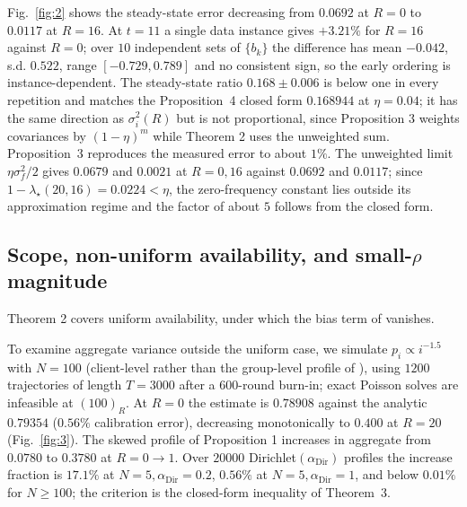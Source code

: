 \documentclass[twoside,11pt]{article}
\begin{document}
Fig.~\ref{fig:2} shows the steady-state error decreasing from
$0.0692$ at $R=0$ to $0.0117$ at $R=16$. At
$t=11$ a single data instance gives $+3.21\%$ for $R=16$ against $R=0$;
over $10$ independent sets of $\{b_k\}$ the difference has mean $-0.042$,
s.d. $0.522$, range $[-0.729,0.789]$ and no consistent sign, so the early
ordering is instance-dependent. The steady-state ratio $0.168\pm0.006$ is
below one in every repetition and matches the Proposition~4 closed form
$0.168944$ at $\eta=0.04$; it has the same direction as
$\sigma_i^{2}(R)$ but is not proportional, since Proposition 3 weights
covariances by $(1-\eta)^m$ while Theorem 2 uses the unweighted sum.
Proposition~3 reproduces the measured error to about $1\%$. The
unweighted limit $\eta\sigma_f^{2}/2$ gives $0.0679$ and $0.0021$ at $R=0,16$ against
$0.0692$ and $0.0117$; since $1-\lambda_\star(20,16)=0.0224<\eta$, the
zero-frequency constant lies outside its approximation regime and the
factor of about $5$ follows from the closed form.

\subsection{\texorpdfstring{Scope, non-uniform availability, and small-$\rho$ magnitude}{Scope, non-uniform availability, and small-rho magnitude}}
Theorem 2 covers uniform availability, under which the bias term of \citep[Thm.~1]{ref1} vanishes.

To examine aggregate variance outside the uniform case, we simulate
$p_i\propto i^{-1.5}$ with $N=100$ (client-level rather than the
group-level profile of \citep[Sec.~6]{ref1}), using $1200$ trajectories of
length $T=3000$ after a $600$-round burn-in; exact Poisson solves are
infeasible at $(100)_R$. At $R=0$ the estimate is $0.78908$ against the
analytic $0.79354$ ($0.56\%$ calibration error), decreasing monotonically to
$0.400$ at $R=20$ (Fig.~\ref{fig:3}). The skewed profile of Proposition 1
increases in aggregate from $0.0780$ to $0.3780$ at $R=0\to1$. Over
$20000$ Dirichlet$(\alpha_{\mathrm{Dir}})$ profiles the increase fraction is $17.1\%$ at
$N=5,\alpha_{\mathrm{Dir}}=0.2$, $0.56\%$ at $N=5,\alpha_{\mathrm{Dir}}=1$, and below $0.01\%$ for
$N\ge100$; the criterion is the closed-form inequality of Theorem~3.
\end{document}
